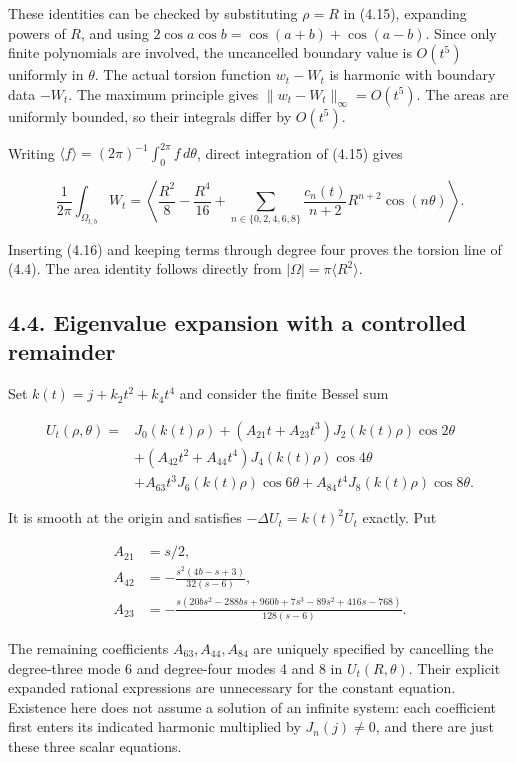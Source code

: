 \documentclass[11pt]{article}
\begin{document}
These identities can be checked by substituting \(\rho=R\) in (4.15),
expanding powers of \(R\), and using
\(2\cos a\cos b=\cos(a+b)+\cos(a-b)\). Since only finite polynomials are
involved, the uncancelled boundary value is \(O(t^5)\) uniformly in
\(\theta\). The actual torsion function \(w_t-W_t\) is harmonic with
boundary data \(-W_t\). The maximum principle gives
\(\|w_t-W_t\|_\infty=O(t^5)\). The areas are uniformly bounded, so their
integrals differ by \(O(t^5)\).

Writing \(\langle f\rangle=(2\pi)^{-1}\int_0^{2\pi}f\,d\theta\), direct
integration of (4.15) gives

\[
\frac{1}{2\pi}\int_{\Omega_{t,b}}W_t
=\left\langle\frac{R^2}{8}-\frac{R^4}{16}
+\sum_{n\in\{0,2,4,6,8\}}\frac{c_n(t)}{n+2}R^{n+2}\cos(n\theta)\right\rangle.
\tag{4.17}
\]

Inserting (4.16) and keeping terms through degree four proves the
torsion line of (4.4). The area identity follows directly from
\(|\Omega|=\pi\langle R^2\rangle\).

\subsection{4.4. Eigenvalue expansion with a controlled
remainder}\label{eigenvalue-expansion-with-a-controlled-remainder}

Set \(k(t)=j+k_2t^2+k_4t^4\) and consider the finite Bessel sum

\[
\begin{aligned}
U_t(\rho,\theta)={}&J_0(k(t)\rho)
+(A_{21}t+A_{23}t^3)J_2(k(t)\rho)\cos2\theta\\
&+(A_{42}t^2+A_{44}t^4)J_4(k(t)\rho)\cos4\theta\\
&+A_{63}t^3J_6(k(t)\rho)\cos6\theta
+A_{84}t^4J_8(k(t)\rho)\cos8\theta.
\end{aligned}
\tag{4.18}
\]

It is smooth at the origin and satisfies \(-\Delta U_t=k(t)^2U_t\)
exactly. Put

\[
\begin{aligned}
A_{21}&=s/2,\\
A_{42}&=-\frac{s^2(4b-s+3)}{32(s-6)},\\
A_{23}&=-\frac{s(20bs^2-288bs+960b+7s^3-89s^2+416s-768)}{128(s-6)}.
\end{aligned}
\tag{4.19}
\]

The remaining coefficients \(A_{63},A_{44},A_{84}\) are uniquely
specified by cancelling the degree-three mode 6 and degree-four modes 4
and 8 in \(U_t(R,\theta)\). Their explicit expanded rational expressions
are unnecessary for the constant equation. Existence here does not
assume a solution of an infinite system: each coefficient first enters
its indicated harmonic multiplied by \(J_n(j)\ne0\), and there are just
these three scalar equations.
\end{document}
